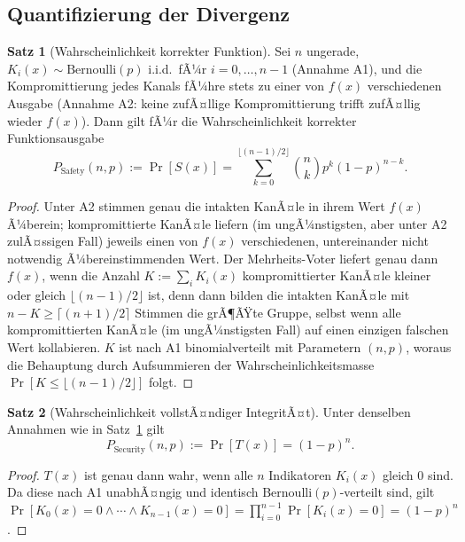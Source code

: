 ﻿\documentclass[a4paper,12pt]{article}
\theoremstyle{definition}
\newtheorem{satz}{Satz}
\begin{document}
\subsection{Quantifizierung der Divergenz}

\begin{satz}[Wahrscheinlichkeit korrekter Funktion]
	\label{satz:pkorrekt}
	Sei $n$ ungerade, $K_i(x) \sim \mathrm{Bernoulli}(p)$ i.i.d.\ fÃ¼r $i=0,\ldots,n-1$ (Annahme A1), und die Kompromittierung jedes Kanals fÃ¼hre stets zu einer von $f(x)$ verschiedenen Ausgabe (Annahme A2: keine zufÃ¤llige Kompromittierung trifft zufÃ¤llig wieder $f(x)$). Dann gilt fÃ¼r die Wahrscheinlichkeit korrekter Funktionsausgabe
	\[
	P_{\mathrm{Safety}}(n,p) := \Pr[S(x)] = \sum_{k=0}^{\lfloor (n-1)/2 \rfloor} \binom{n}{k} p^k (1-p)^{n-k}.
	\]
\end{satz}

\begin{proof}
	Unter A2 stimmen genau die intakten KanÃ¤le in ihrem Wert $f(x)$ Ã¼berein; kompromittierte KanÃ¤le liefern (im ungÃ¼nstigsten, aber unter A2 zulÃ¤ssigen Fall) jeweils einen von $f(x)$ verschiedenen, untereinander nicht notwendig Ã¼bereinstimmenden Wert. Der Mehrheits-Voter liefert genau dann $f(x)$, wenn die Anzahl $K := \sum_i K_i(x)$ kompromittierter KanÃ¤le kleiner oder gleich $\lfloor (n-1)/2 \rfloor$ ist, denn dann bilden die intakten KanÃ¤le mit $n-K \geq \lceil (n+1)/2 \rceil$ Stimmen die grÃ¶ÃŸte Gruppe, selbst wenn alle kompromittierten KanÃ¤le (im ungÃ¼nstigsten Fall) auf einen einzigen falschen Wert kollabieren. $K$ ist nach A1 binomialverteilt mit Parametern $(n,p)$, woraus die Behauptung durch Aufsummieren der Wahrscheinlichkeitsmasse $\Pr[K \leq \lfloor (n-1)/2\rfloor]$ folgt. \qedhere
\end{proof}

\begin{satz}[Wahrscheinlichkeit vollstÃ¤ndiger IntegritÃ¤t]
	\label{satz:psecure}
	Unter denselben Annahmen wie in Satz~\ref{satz:pkorrekt} gilt
	\[
	P_{\mathrm{Security}}(n,p) := \Pr[T(x)] = (1-p)^n.
	\]
\end{satz}

\begin{proof}
	$T(x)$ ist genau dann wahr, wenn alle $n$ Indikatoren $K_i(x)$ gleich $0$ sind. Da diese nach A1 unabhÃ¤ngig und identisch $\mathrm{Bernoulli}(p)$-verteilt sind, gilt $\Pr[K_0(x)=0 \wedge \cdots \wedge K_{n-1}(x)=0] = \prod_{i=0}^{n-1}\Pr[K_i(x)=0] = (1-p)^n$. \qedhere
\end{proof}
\end{document}

